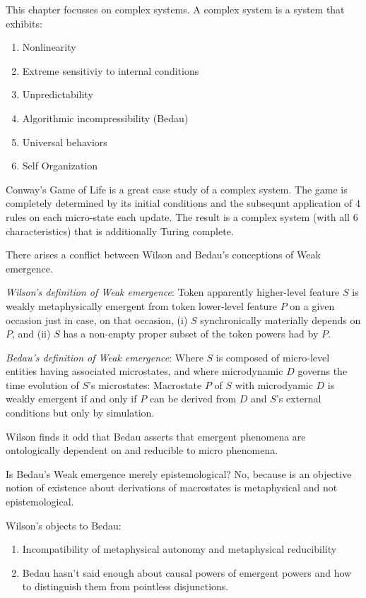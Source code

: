 \documentclass{article}
\newcommand{\ti}[1]{\textit{#1}}
\begin{document}
This chapter focusses on complex systems. A complex system is a system that exhibits:
\begin{enumerate}
\item Nonlinearity
\item Extreme sensitiviy to internal conditions
\item Unpredictability
\item Algorithmic incompressibility (Bedau)
\item Universal behaviors
\item Self Organization
\end{enumerate}

Conway's Game of Life is a great case study of a complex system. The game is completely determined by its initial conditions and the subsequnt application of 4 rules on each micro-state each update. The result is a complex system (with all 6 characteristics) that is additionally Turing complete.

There arises a conflict between Wilson and Bedau's conceptions of Weak emergence.

\ti{Wilson's definition of Weak emergence}: Token apparently higher-level feature $S$ is weakly metaphysically emergent from token lower-level feature $P$ on a given occasion just in case, on that occasion, (i) $S$ synchronically materially depends on $P$, and (ii) $S$ has a non-empty proper subset of the token powers had by $P$.

\ti{Bedau's definition of Weak emergence}: Where $S$ is composed of micro-level entities having associated microstates, and where microdynamic $D$ governs the time evolution of $S$'s microstates: Macrostate $P$ of $S$ with microdyamic $D$ is weakly emergent if and only if $P$ can be derived from $D$ and $S$'s external conditions but only by simulation.

Wilson finds it odd that Bedau asserts that emergent phenomena are ontologically dependent on and reducible to micro phenomena.

Is Bedau's Weak emergence merely epistemological? No, because is an objective notion of existence about derivations of macrostates is metaphysical and not epistemological.

Wilson's objects to Bedau:
\begin{enumerate}
\item Incompatibility of metaphysical autonomy and metaphysical reducibility
\item Bedau hasn't said enough about causal powers of emergent powers and how to distinguish them from pointless disjunctions.
\end{enumerate}
\end{document}
